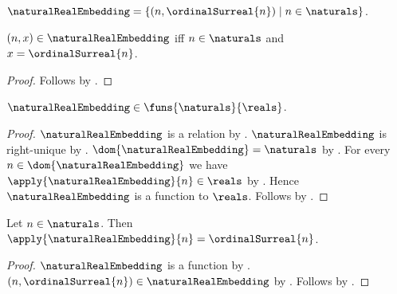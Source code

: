 \begin{definition}\label{natural_real_embedding}
    $\naturalRealEmbedding=
        \{(n,\ordinalSurreal{n})\mid n\in\naturals\}$.
\end{definition}

\begin{proposition}\label{natural_real_embedding_membership}
    $(n,x)\in\naturalRealEmbedding$ iff
        $n\in\naturals$ and $x=\ordinalSurreal{n}$.
\end{proposition}
\begin{proof}
    Follows by .
\end{proof}

\begin{proposition}\label{natural_real_embedding_type}
    $\naturalRealEmbedding\in\funs{\naturals}{\reals}$.
\end{proposition}
\begin{proof}
    $\naturalRealEmbedding$ is a relation by
        .
    $\naturalRealEmbedding$ is right-unique by
        .
    $\dom{\naturalRealEmbedding}=\naturals$ by
        .
    For every $n\in\dom{\naturalRealEmbedding}$ we have
        $\apply{\naturalRealEmbedding}{n}\in\reals$ by
        .
    Hence $\naturalRealEmbedding$ is a function to $\reals$.
    Follows by .
\end{proof}

\begin{proposition}\label{natural_real_embedding_application}
    Let $n\in\naturals$.
    Then $\apply{\naturalRealEmbedding}{n}=\ordinalSurreal{n}$.
\end{proposition}
\begin{proof}
    $\naturalRealEmbedding$ is a function by
        .
    $(n,\ordinalSurreal{n})\in\naturalRealEmbedding$ by
        .
    Follows by .
\end{proof}


